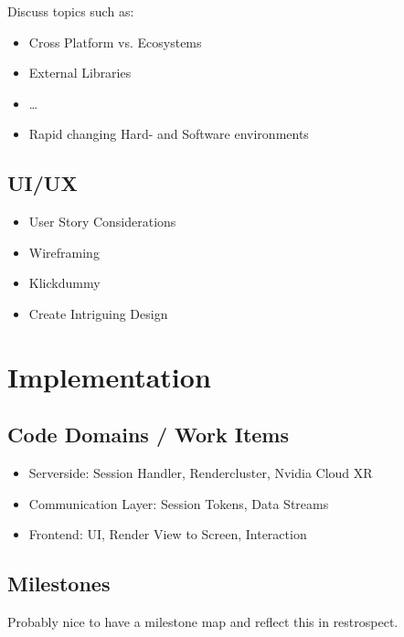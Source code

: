 \documentclass[titlepage, a4paper, 11pt]{scrartcl}
\begin{document}
            Discuss topics such as:

            \begin{itemize}
                \item Cross Platform vs. Ecosystems
                \item External Libraries
                \item \dots
                \item Rapid changing Hard- and Software environments
            \end{itemize}

        \subsection{UI/UX}

            \begin{itemize}
                \item User Story Considerations
                \item Wireframing
                \item Klickdummy
                \item Create Intriguing Design
            \end{itemize}

    \section{Implementation}

        \subsection{Code Domains / Work Items}
            \begin{itemize}
                \item Serverside: Session Handler, Rendercluster, Nvidia Cloud XR
                \item Communication Layer: Session Tokens, Data Streams
                \item Frontend: UI, Render View to Screen, Interaction
            \end{itemize}
        
        \subsection{Milestones}
        
            Probably nice to have a milestone map and reflect this in restrospect.
\end{document}
